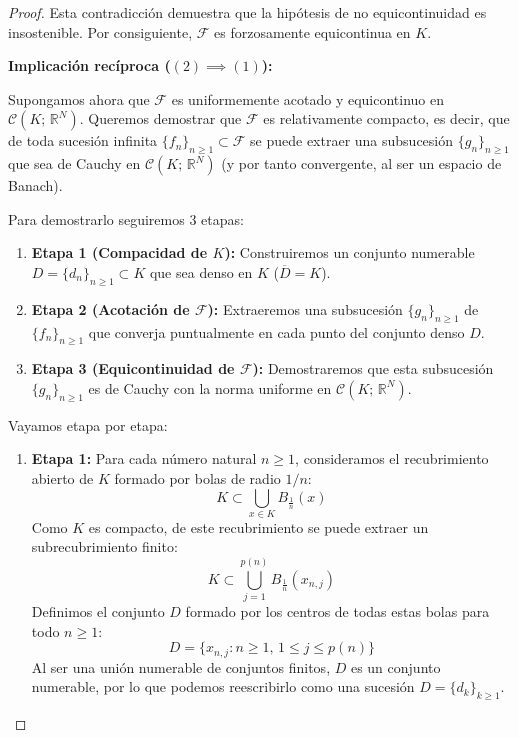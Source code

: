 \begin{proof}
    Esta contradicción demuestra que la hipótesis de no equicontinuidad es insostenible. Por consiguiente, $\mathcal{F}$ es forzosamente equicontinua en $K$.

    \medskip

    \textbf{Implicación recíproca ($(2) \implies (1)$):}

    Supongamos ahora que $\mathcal{F}$ es uniformemente acotado y equicontinuo en $\mathcal{C}(K; \, \mathbb{R}^N)$. Queremos demostrar que $\mathcal{F}$ es relativamente compacto, es decir, que de toda sucesión infinita $\{f_n\}_{n \geq 1} \subset \mathcal{F}$ se puede extraer una subsucesión $\{g_n\}_{n \geq 1}$ que sea de Cauchy en $\mathcal{C}(K; \, \mathbb{R}^N)$ (y por tanto convergente, al ser un espacio de Banach).
    
    Para demostrarlo seguiremos 3 etapas:
    \begin{enumerate}
        \item \textbf{Etapa 1 (Compacidad de $K$):} Construiremos un conjunto numerable $D = \{d_n\}_{n \geq 1} \subset K$ que sea denso en $K$ ($\overline{D} = K$).
        \item \textbf{Etapa 2 (Acotación de $\mathcal{F}$):} Extraeremos una subsucesión $\{g_n\}_{n \geq 1}$ de $\{f_n\}_{n \geq 1}$ que converja puntualmente en cada punto del conjunto denso $D$.
        \item \textbf{Etapa 3 (Equicontinuidad de $\mathcal{F}$):} Demostraremos que esta subsucesión $\{g_n\}_{n \geq 1}$ es de Cauchy con la norma uniforme en $\mathcal{C}(K; \, \mathbb{R}^N)$.
    \end{enumerate}

    Vayamos etapa por etapa:
    \begin{enumerate}
        \item \textbf{Etapa 1:} Para cada número natural $n \geq 1$, consideramos el recubrimiento abierto de $K$ formado por bolas de radio $1/n$:
        \[
            K \subset \bigcup_{x \in K} B_{\frac{1}{n}}(x)
        \]
        Como $K$ es compacto, de este recubrimiento se puede extraer un subrecubrimiento finito:
        \[
            K \subset \bigcup_{j=1}^{p(n)} B_{\frac{1}{n}}(x_{n,j})
        \]
        Definimos el conjunto $D$ formado por los centros de todas estas bolas para todo $n \geq 1$:
        \[
            D = \{x_{n,j} : n \geq 1, \, 1 \leq j \leq p(n)\}
        \]
        Al ser una unión numerable de conjuntos finitos, $D$ es un conjunto numerable, por lo que podemos reescribirlo como una sucesión $D = \{d_k\}_{k \geq 1}$. 
        

\end{enumerate}
\end{proof}
